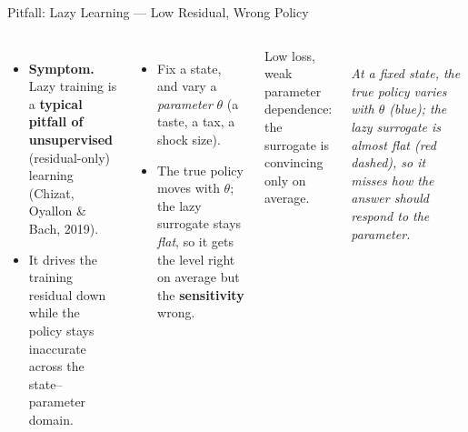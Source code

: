 \documentclass[aspectratio=169,11pt]{beamer}
\newcommand{\lemph}[1]{{\color{uzhblue}\bfseries #1}}
\newcommand{\visualcaption}[1]{{\scriptsize\color{stone}\itshape #1}}
\begin{document}

\begin{frame}[shrink=10]{Pitfall: Lazy Learning --- Low Residual, Wrong Policy}
\begin{columns}[T,onlytextwidth]
{\footnotesize
\begin{itemize}\setlength\itemsep{2pt}
  \item \textbf{\color{uzhblue}Symptom.} Lazy training is a \lemph{typical pitfall of unsupervised} (residual-only) learning (Chizat, Oyallon \& Bach, 2019).
  \item It drives the training residual down while the policy stays inaccurate across the state--parameter domain.
\end{itemize}}
\vspace{0.3em}
\begin{itemize}\setlength\itemsep{3pt}\footnotesize
  \item Fix a state, and vary a \emph{parameter} $\theta$ (a taste, a tax, a shock size).
  \item The true policy moves with $\theta$; the lazy surrogate stays \emph{flat}, so it gets the level right on average but the \lemph{sensitivity} wrong.
\end{itemize}
\begin{pitfall}
\footnotesize Low loss, weak parameter dependence: the surrogate is convincing only on average.
\end{pitfall}
\centering
{}\\[1pt]
\visualcaption{At a fixed state, the true policy varies with $\theta$ (blue); the lazy surrogate is almost flat (red dashed), so it misses how the answer should respond to the parameter.}
\end{columns}
\end{frame}
\end{document}
